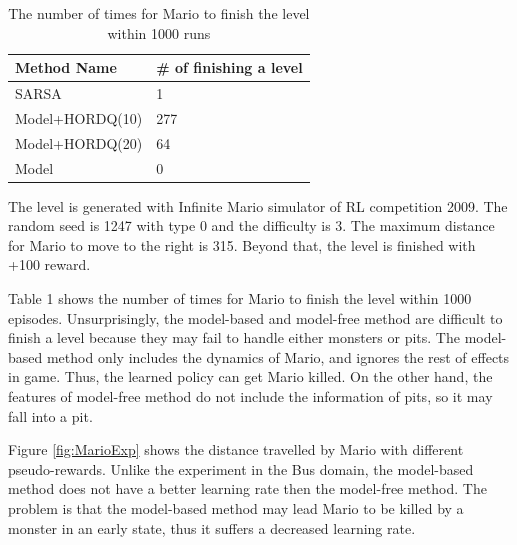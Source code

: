 \begin{table}
    \begin{center}
\begin{tabular}[h]{l|l}
\hline
Method Name & \# of finishing a level\\
\hline
SARSA    & 1\\
Model+HORDQ(10)    & 277\\
Model+HORDQ(20)     & 64\\
Model        & 0\\
\hline
\hline
\end{tabular}
\end{center}
\caption{The number of times for Mario to finish the level within 1000 runs}
\end{table}


The level is generated with Infinite Mario simulator of RL competition 2009. The random seed is 1247
with type 0 and the difficulty is 3.
The maximum distance for Mario to move to the right is 315.
Beyond that, the level is finished with +100 reward.


Table 1 shows the number of times for Mario to finish the level within 1000 episodes.
Unsurprisingly, the model-based and model-free method are difficult
to finish a level because they may fail to handle either monsters or pits.
The model-based method only includes the dynamics of Mario, and ignores the rest of effects in game.
Thus, the learned policy can get Mario killed. On the other hand, the features of model-free method
do not include the information of pits, so it may fall into a pit.

Figure \ref{fig:MarioExp} shows the distance travelled by Mario with different pseudo-rewards.
Unlike the experiment in the Bus domain, the model-based method does not have
a better learning rate then the model-free method. The problem is that the model-based method
may lead Mario to be killed by a monster in an early state, thus it suffers a decreased learning rate.

